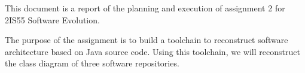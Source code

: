 This document is a report of the planning and execution of assignment 2 for 2IS55 Software Evolution.

The purpose of the assignment is to build a toolchain to reconstruct software architecture based on Java source code.
Using this toolchain, we will reconstruct the class diagram of three software repositories.


